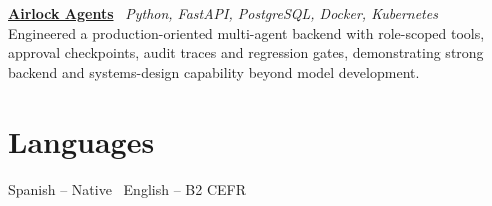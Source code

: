 \documentclass[10pt,a4paper]{article}
\newcommand{\project}[3]{
  \textbf{#1} \textbar\ {\small\color{muted}\textit{#2}}\\[-1.5pt]
  #3\par\vspace{2pt}
}
\begin{document}
\project{\href{https://lucasfiz.dev/en/projects/airlock-agents}{Airlock Agents}}{Python, FastAPI, PostgreSQL, Docker, Kubernetes}{Engineered a production-oriented multi-agent backend with role-scoped tools, approval checkpoints, audit traces and regression gates, demonstrating strong backend and systems-design capability beyond model development.}

\section{Languages}
Spanish -- Native \textbar\ English -- B2 CEFR
\end{document}
